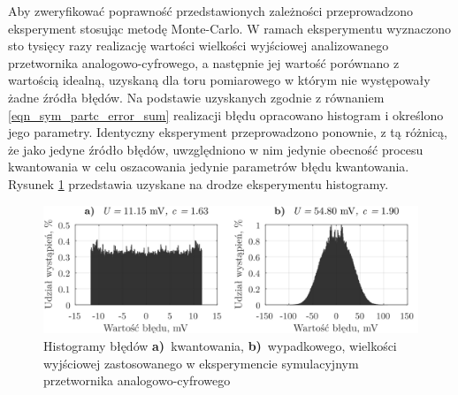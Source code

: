 Aby zweryfikować poprawność przedstawionych zależności przeprowadzono eksperyment stosując metodę Monte-Carlo. W ramach eksperymentu wyznaczono sto tysięcy razy realizację wartości wielkości wyjściowej analizowanego przetwornika analogowo-cyfrowego, a następnie jej wartość porównano z wartością idealną, uzyskaną dla toru pomiarowego w którym nie występowały żadne źródła błędów. Na podstawie uzyskanych zgodnie z równaniem \eqref{eqn_sym_partc_error_sum} realizacji błędu opracowano histogram i określono jego parametry. Identyczny eksperyment przeprowadzono ponownie, z tą różnicą, że jako jedyne źródło błędów, uwzględniono w nim jedynie obecność procesu kwantowania w celu oszacowania jedynie parametrów błędu kwantowania. Rysunek \ref{fig_symul_partc_hist} przedstawia uzyskane na drodze eksperymentu histogramy.

\begin{figure}[htb!]
\begin{center}
\includegraphics{obrazki/hist_part_c}
\caption{Histogramy błędów \textbf{a)}~kwantowania, \textbf{b)}~wypadkowego, wielkości wyjściowej zastosowanego w eksperymencie symulacyjnym przetwornika analogowo-cyfrowego \label{fig_symul_partc_hist}}
\end{center}
\end{figure}


